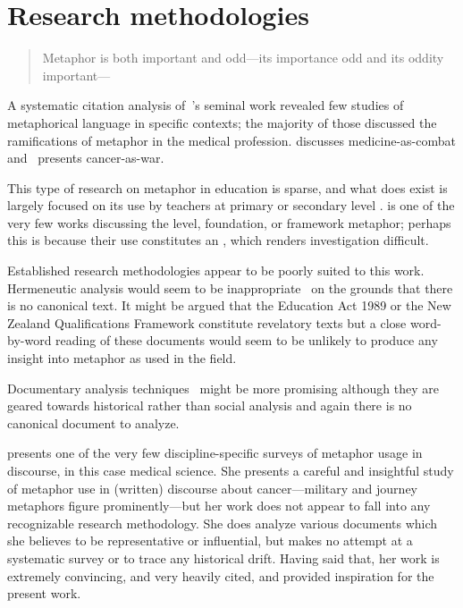 \section{Research methodologies}

\begin{singlespace}
\begin{quote}
  Metaphor is both important and odd---its importance odd and its
  oddity important---
\end{quote}
\end{singlespace}

A systematic citation analysis of~'s seminal work
revealed few studies of metaphorical language in specific contexts;
the majority of those discussed the ramifications of metaphor in the
medical profession.   discusses
medicine-as-combat and~ presents cancer-as-war.

This type of research on metaphor in education is sparse, and what
does exist is largely focused on its use by teachers at primary or
secondary level \citep{munby1986,cameron2003}.  
is one of the very few works discussing the level, foundation, or
framework metaphor; perhaps this is because their use constitutes an
, which renders investigation difficult.

Established research methodologies appear to be poorly suited to this
work.  Hermeneutic analysis would seem to be
inappropriate~ on the grounds that there is no
canonical text.  It might be argued that the Education Act 1989 or the
New Zealand Qualifications Framework constitute revelatory texts but a
close word-by-word reading of these documents would seem to be unlikely to produce
any insight into metaphor as used in the field.

Documentary analysis techniques~\parencite{fitzgerald2012} might be
more promising although they are geared towards historical rather than
social analysis and again there is no canonical document to analyze.

 presents one of the very few
discipline-specific surveys of metaphor usage in discourse, in this
case medical science.  She presents a careful and insightful study of
metaphor use in (written) discourse about cancer---military and
journey metaphors figure prominently---but her work does not appear to
fall into any recognizable research methodology.  She does analyze
various documents which she believes to be representative or
influential, but makes no attempt at a systematic survey or to trace
any historical drift.  Having said that, her work is extremely
convincing, and very heavily cited, and provided inspiration for the
present work.

